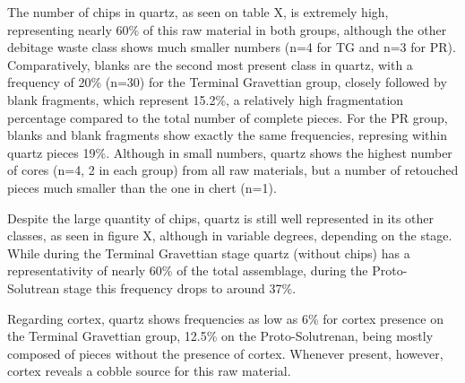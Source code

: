\documentclass[12pt,twoside]{reedthesis}
\begin{document}
The number of chips in quartz, as seen on table X, is extremely high, representing nearly 60\% of this raw material in both groups, although the other debitage waste class shows much smaller numbers (n=4 for TG and n=3 for PR). Comparatively, blanks are the second most present class in quartz, with a frequency of 20\% (n=30) for the Terminal Gravettian group, closely followed by blank fragments, which represent 15.2\%, a relatively high fragmentation percentage compared to the total number of complete pieces. For the PR group, blanks and blank fragments show exactly the same frequencies, represing within quartz pieces 19\%. Although in small numbers, quartz shows the highest number of cores (n=4, 2 in each group) from all raw materials, but a number of retouched pieces much smaller than the one in chert (n=1).

Despite the large quantity of chips, quartz is still well represented in its other classes, as seen in figure X, although in variable degrees, depending on the stage. While during the Terminal Gravettian stage quartz (without chips) has a representativity of nearly 60\% of the total assemblage, during the Proto-Solutrean stage this frequency drops to around 37\%.

Regarding cortex, quartz shows frequencies as low as 6\% for cortex presence on the Terminal Gravettian group, 12.5\% on the Proto-Solutrenan, being mostly composed of pieces without the presence of cortex. Whenever present, however, cortex reveals a cobble source for this raw material.
\end{document}

